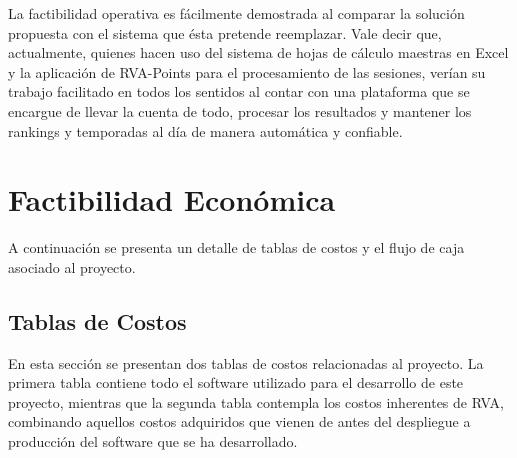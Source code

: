 La factibilidad operativa es fácilmente demostrada al comparar la solución propuesta con el sistema que ésta pretende reemplazar. Vale decir que, actualmente, quienes hacen uso del sistema de hojas de cálculo maestras en Excel y la aplicación de RVA-Points para el procesamiento de las sesiones, verían su trabajo facilitado en todos los sentidos al contar con una plataforma que se encargue de llevar la cuenta de todo, procesar los resultados y mantener los rankings y temporadas al día de manera automática y confiable.

\section{Factibilidad Económica}
A continuación se presenta un detalle de tablas de costos y el flujo de caja asociado al proyecto. 

\subsection{Tablas de Costos}
\label{feasibility:costs}
En esta sección se presentan dos tablas de costos relacionadas al proyecto. La primera tabla contiene todo el software utilizado para el desarrollo de este proyecto, mientras que la segunda tabla contempla los costos inherentes de RVA, combinando aquellos costos adquiridos que vienen de antes del despliegue a producción del software que se ha desarrollado.


